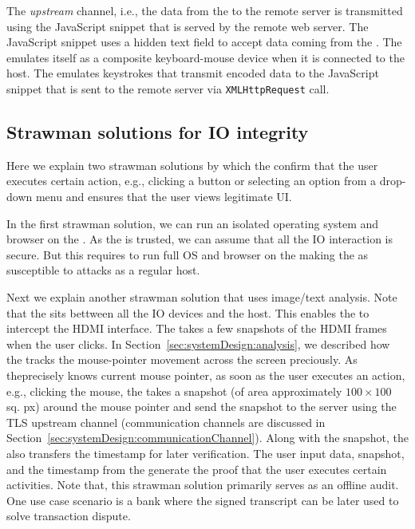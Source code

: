 The \emph{upstream} channel, i.e., the data from the \device to the remote server is transmitted using the \name JavaScript snippet that is served by the remote web server. The \name JavaScript snippet uses a hidden text field to accept data coming from the \device. The \device emulates itself as a composite keyboard-mouse device when it is connected to the host. The \device emulates keystrokes that transmit encoded data to the \name JavaScript snippet that is sent to the remote server via \texttt{XMLHttpRequest} call.
\fi


\subsection{Strawman solutions for IO integrity}
\label{sec:systemDesign:strawman}

Here we explain two strawman solutions by which the \device confirm that the user executes certain action, e.g., clicking a button  or selecting an option from a drop-down menu and ensures that the user views legitimate UI.

 In the first strawman solution, we can run an isolated operating system and browser on the \device. As the \device is trusted, we can assume that all the IO interaction is secure. But this requires to run full OS and browser on the \device making the \device as susceptible to attacks as a regular host. 

 Next we explain another strawman solution that uses image/text analysis. Note that the \device sits bettween all the IO devices and the host. This enables the \device to intercept the HDMI interface. The \device takes a few snapshots of the HDMI frames when the user clicks. In Section~\ref{sec:systemDesign:analysis}, we described how the \device tracks the mouse-pointer movement across the screen preciously. As the\device precisely knows current mouse pointer, as soon as the user executes an action, e.g., clicking the mouse, the \device takes a snapshot (of area approximately $100 \times 100$ sq. px) around the mouse pointer and send the snapshot to the server using the TLS upstream channel (communication channels are discussed in Section~\ref{sec:systemDesign:communicationChannel}). Along with the snapshot, the \device also transfers the timestamp for later verification. The user input data, snapshot, and the timestamp from the \device generate the proof that the user executes certain activities. Note that, this strawman solution primarily serves as an offline audit. One use case scenario is a bank where the signed transcript can be later used to solve transaction dispute. 


